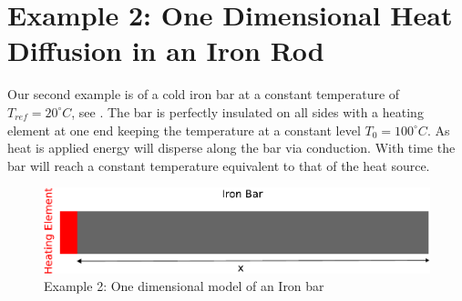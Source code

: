 
%
%
%


\section{Example 2: One Dimensional Heat Diffusion in an Iron Rod}
\label{Sec:1DHDv0}

Our second example is of a cold iron bar at a constant temperature of
$T_{ref}=20^{\circ} C$, see . The bar is
perfectly insulated on all sides with a heating element at one end keeping the
temperature at a constant level $T_0=100^{\circ} C$.  As heat is
applied energy will disperse along the bar via conduction. With time the bar
will reach a constant temperature equivalent to that of the heat source.

\begin{figure}[ht]
\centerline{\includegraphics[width=4.in]{figures/onedheatdiff002}}
\caption{Example 2: One dimensional model of an Iron bar}
\label{fig:onedhdmodel}
\end{figure}

